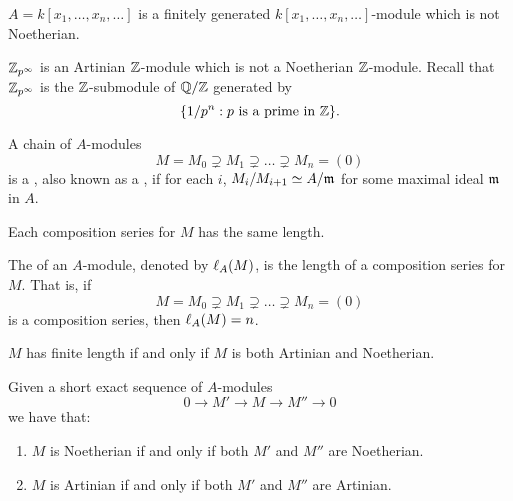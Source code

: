 \documentclass{ximera}
\begin{document}
\begin{example} $A=k[x_1,\dots,x_n,\dots]$ is a finitely generated $k[x_1,\dots,x_n,\dots]$-module which is not Noetherian.
\end{example}

\begin{example} $\mathbb Z_{p^\infty}$ is an Artinian $\mathbb Z$-module which is not a Noetherian $\mathbb Z$-module. Recall that $\mathbb Z_{p^\infty}$ is the $\mathbb Z$-submodule of $\mathbb Q/\mathbb Z$ generated by
\[
\{1/p^n : p\text{ is a prime in } \mathbb Z\}.
\]
\end{example}





\begin{definition} A chain of $A$-modules
\[
M = M_0 \supsetneq M_1\supsetneq \dots \supsetneq M_n =(0)
\]
is a , also known as a , if for each $i$, $M_i/M_{i+1}\simeq A/\mathfrak m$ for some maximal ideal $\mathfrak m$ in $A$.
\end{definition}

\begin{proposition} Each composition series for $M$ has the same length.
\end{proposition}


\begin{definition} The  of an $A$-module, denoted by $\ell_A(M)$, is the length of a composition series for $M$. That is, if
\[
M = M_0 \supsetneq M_1\supsetneq \dots \supsetneq M_n =(0)
\]
is a composition series, then $\ell_A(M)=n$.
\end{definition}



\begin{proposition} $M$ has finite length if and only if $M$ is both Artinian and Noetherian.
\end{proposition}


\begin{proposition}  Given a short exact sequence of $A$-modules
\[
0\to M' \to M\to M'' \to 0
\]
we have that:
\begin{enumerate}
\item $M$ is Noetherian if and only if both $M'$ and $M''$ are Noetherian.
\item $M$ is Artinian if and only if both $M'$ and $M''$ are Artinian.
\end{enumerate}
\end{proposition}
\end{document}
